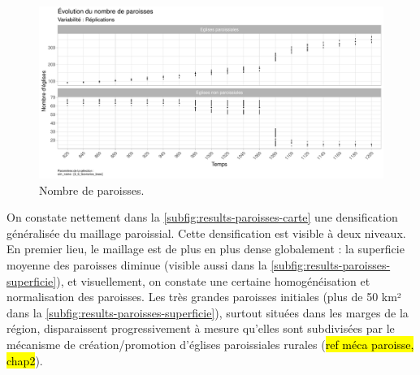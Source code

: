 \begin{figure}[H]
	\centering
	\includegraphics[width=\linewidth]{img/results_6_6/Paroisses_Nb_Haut.pdf}
	\caption{Nombre de paroisses.}
	\label{fig:results-paroisses-nb}
\end{figure}

On constate nettement dans la \cref{subfig:results-paroisses-carte} une densification généralisée du maillage paroissial.
Cette densification est visible à deux niveaux.
En premier lieu, le maillage est de plus en plus dense globalement : la superficie moyenne des paroisses diminue (visible aussi dans la \cref{subfig:results-paroisses-superficie}), et visuellement, on constate une certaine homogénéisation et normalisation des paroisses.
Les très grandes paroisses initiales (plus de 50 km² dans la \cref{subfig:results-paroisses-superficie}), surtout situées dans les marges de la région, disparaissent progressivement à mesure qu'elles sont subdivisées par le mécanisme de création/promotion d'églises paroissiales rurales (\hl{ref méca paroisse, chap2}).


